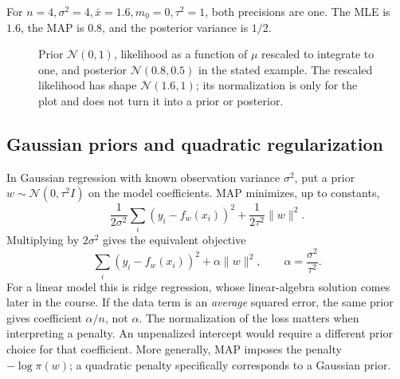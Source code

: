 For \(n=4,\sigma^2=4,\bar x=1.6,m_0=0,\tau^2=1\), both precisions
are one. The MLE is \(1.6\), the MAP is \(0.8\), and the posterior
variance is \(1/2\).

\begin{figure}[H]
  \centering\EstGaussianPriorPlot
  \caption{Prior \(\mathcal N(0,1)\), likelihood as a function of \(\mu\)
  rescaled to integrate to one, and posterior \(\mathcal N(0.8,0.5)\) in
  the stated example. The rescaled likelihood has shape \(\mathcal N(1.6,1)\);
  its normalization is only for the plot and does not turn it into a prior
  or posterior.}
  \label{fig:est-gaussian-prior}
\end{figure}

\subsection{Gaussian priors and quadratic regularization}

In Gaussian regression with known observation variance \(\sigma^2\),
put a prior \(w\sim\mathcal N(0,\tau^2I)\) on the model coefficients.
MAP minimizes, up to constants,
\[
  \frac1{2\sigma^2}\sum_i(y_i-f_w(x_i))^2+
  \frac1{2\tau^2}\|w\|^2.
\]
Multiplying by \(2\sigma^2\) gives the equivalent objective
\begin{equation}
  \sum_i(y_i-f_w(x_i))^2+\alpha\|w\|^2,
  \qquad \alpha=\frac{\sigma^2}{\tau^2}.
  \label{eq:map-quadratic-penalty}
\end{equation}
For a linear model this is ridge regression, whose linear-algebra solution
comes later in the course. If the data term is an \emph{average} squared
error, the same prior gives coefficient \(\alpha/n\), not \(\alpha\).
The normalization of the loss matters when interpreting a penalty.
An unpenalized intercept would require a different prior choice for that
coefficient. More generally, MAP imposes the penalty \(-\log\pi(w)\);
a quadratic penalty specifically corresponds to a Gaussian prior.

\endgroup

